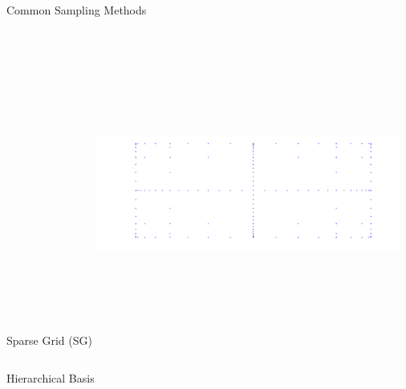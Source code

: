 \documentclass[final]{beamer}
\begin{document}
\begin{frame}{}
{\begin{columns}[t]
\begin{column}{.30\linewidth}
\begin{block}{\centering Common Sampling Methods}
\begin{columns}[T]
\begin{column}{12cm}{\centering \scriptsize{Sparse Grid (SG)}}
\centering\includegraphics[height=10cm, width = 10cm]{figures/smolyakpoints}
\end{column}
\end{columns}


\end{block}
                
\begin{block}{\centering Hierarchical Basis}

\vspace{1em}


\end{block}
\end{column}
\end{columns}}
\end{frame}
\end{document}
